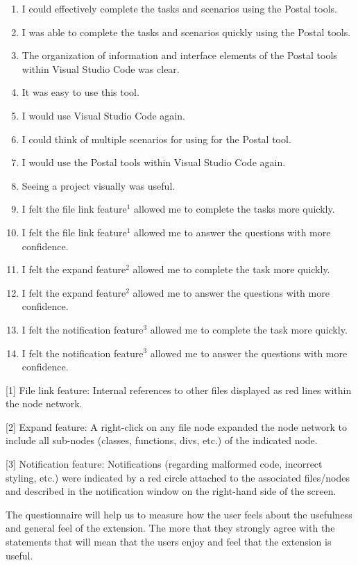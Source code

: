 \documentclass[letterpaper,10pt,titlepage,draftclsnofoot,onecolumn,onesided] {IEEEtran}
\begin{document}
	\begin{enumerate}
		\item I could effectively complete the tasks and scenarios using the Postal tools.
		\item I was able to complete the tasks and scenarios quickly using the Postal tools.
		\item The organization of information and interface elements of the Postal tools within Visual Studio Code was clear.
		\item It was easy to use this tool.
		\item I would use Visual Studio Code again.
		\item I could think of multiple scenarios for using for the Postal tool. 
		\item I would use the Postal tools within Visual Studio Code again.
		\item Seeing a project visually was useful. 
		\item I felt the file link feature$^1$ allowed me to complete the tasks more quickly.
		\item I felt the file link feature$^1$ allowed me to answer the questions with more confidence.
		\item I felt the expand feature$^2$ allowed me to complete the task more quickly.
		\item I felt the expand feature$^2$ allowed me to answer the questions with more confidence.
		\item I felt the notification feature$^3$ allowed me to complete the task more quickly.
		\item I felt the notification feature$^3$ allowed me to answer the questions with more confidence.	
	\end{enumerate}

	[1] File link feature: Internal references to other files displayed as red lines within the node network.

	[2] Expand feature: A right-click on any file node expanded the node network to include all sub-nodes (classes, functions, divs, etc.) of the indicated node.

	[3] Notification feature: Notifications (regarding malformed code, incorrect styling, etc.) were indicated by a red circle attached to the associated files/nodes and described in the notification window on the right-hand side of the screen.

	The questionnaire will help us to measure how the user feels about the usefulness and general feel of the extension. 
	The more that they strongly agree with the statements that will mean that the users enjoy and feel that the extension is useful.
\end{document}
